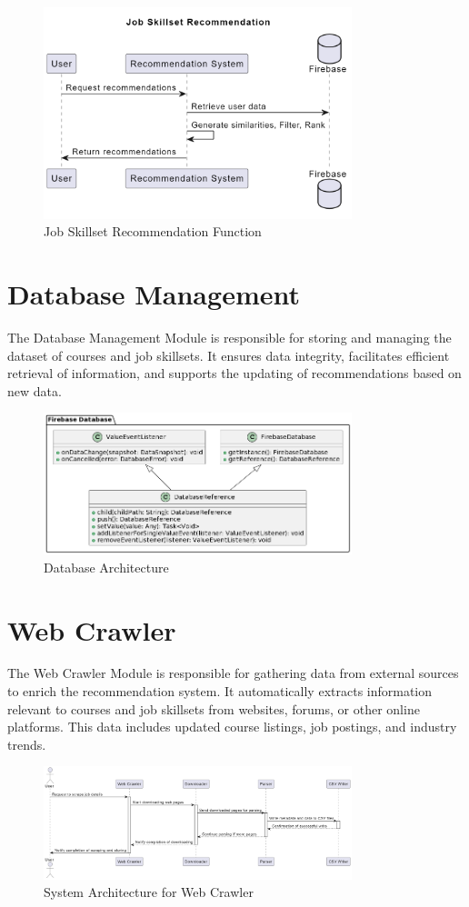 \begin{figure}[h]
\centering
\includegraphics[width=0.8\textwidth]{3/skillset.png}
\caption{Job Skillset Recommendation Function}
\label{fig:job_skillset_recommendation}
\end{figure}

\section{Database Management}

The Database Management Module is responsible for storing and managing the dataset of courses and job skillsets. It ensures data integrity, facilitates efficient retrieval of information, and supports the updating of recommendations based on new data.

\begin{figure}[h]
\centering
\includegraphics[width=0.8\textwidth]{3/database.png}
\caption{Database Architecture}
\label{fig:database_architecture}
\end{figure}

\section{Web Crawler}

The Web Crawler Module is responsible for gathering data from external sources to enrich the recommendation system. It automatically extracts information relevant to courses and job skillsets from websites, forums, or other online platforms. This data includes updated course listings, job postings, and industry trends.

\begin{figure}[h]
\centering
\includegraphics[width=0.8\textwidth]{3/webcrawler.png}
\caption{System Architecture for Web Crawler}
\label{fig:web_crawler}
\end{figure}
